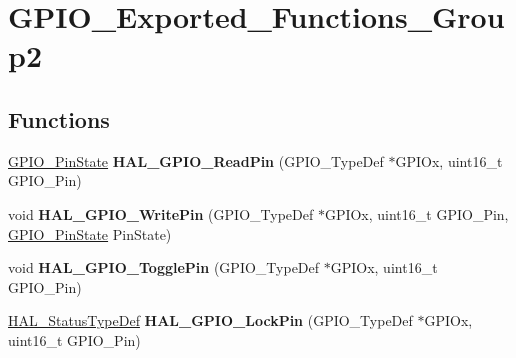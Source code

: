 \hypertarget{group___g_p_i_o___exported___functions___group2}{}\section{G\+P\+I\+O\+\_\+\+Exported\+\_\+\+Functions\+\_\+\+Group2}
\label{group___g_p_i_o___exported___functions___group2}
\subsection*{Functions}
\begin{DoxyCompactItemize}
\item 
\mbox{\label{group___g_p_i_o___exported___functions___group2_gaf2b819ea6551319ddd5670db318d2e4e}} 
\hyperlink{group___g_p_i_o___exported___types_ga5b3ef0486b179415581eb342e0ea6b43}{G\+P\+I\+O\+\_\+\+Pin\+State} {\bfseries H\+A\+L\+\_\+\+G\+P\+I\+O\+\_\+\+Read\+Pin} (G\+P\+I\+O\+\_\+\+Type\+Def $\ast$G\+P\+I\+Ox, uint16\+\_\+t G\+P\+I\+O\+\_\+\+Pin)
\item 
\mbox{\label{group___g_p_i_o___exported___functions___group2_gaf4b97bdf533a02f51ef696d43b6da5c4}} 
void {\bfseries H\+A\+L\+\_\+\+G\+P\+I\+O\+\_\+\+Write\+Pin} (G\+P\+I\+O\+\_\+\+Type\+Def $\ast$G\+P\+I\+Ox, uint16\+\_\+t G\+P\+I\+O\+\_\+\+Pin, \hyperlink{group___g_p_i_o___exported___types_ga5b3ef0486b179415581eb342e0ea6b43}{G\+P\+I\+O\+\_\+\+Pin\+State} Pin\+State)
\item 
\mbox{\label{group___g_p_i_o___exported___functions___group2_gaf5e0c89f752de5cdedcc30db068133f6}} 
void {\bfseries H\+A\+L\+\_\+\+G\+P\+I\+O\+\_\+\+Toggle\+Pin} (G\+P\+I\+O\+\_\+\+Type\+Def $\ast$G\+P\+I\+Ox, uint16\+\_\+t G\+P\+I\+O\+\_\+\+Pin)
\item 
\mbox{\label{group___g_p_i_o___exported___functions___group2_gad03c868b4a4fb25883c1bb86d0c7e9ca}} 
\hyperlink{stm32f1xx__hal__def_8h_a63c0679d1cb8b8c684fbb0632743478f}{H\+A\+L\+\_\+\+Status\+Type\+Def} {\bfseries H\+A\+L\+\_\+\+G\+P\+I\+O\+\_\+\+Lock\+Pin} (G\+P\+I\+O\+\_\+\+Type\+Def $\ast$G\+P\+I\+Ox, uint16\+\_\+t G\+P\+I\+O\+\_\+\+Pin)

\end{DoxyCompactItemize}
